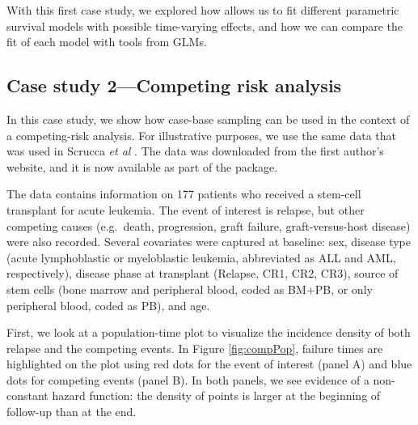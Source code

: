 With this first case study, we explored how  allows us to
fit different parametric survival models with possible time-varying
effects, and how we can compare the fit of each model with tools from
GLMs.

\hypertarget{case-study-2competing-risk-analysis}{%
\subsection{Case study 2---Competing risk
analysis}\label{case-study-2competing-risk-analysis}}

In this case study, we show how case-base sampling can be used in the
context of a competing-risk analysis. For illustrative purposes, we use
the same data that was used in Scrucca \emph{et al}
\citeyearpar{scrucca2010regression}. The data was downloaded from the
first author's website, and it is now available as part of the
 package.

The data contains information on 177 patients who received a stem-cell
transplant for acute leukemia. The event of interest is relapse, but
other competing causes (e.g.~death, progression, graft failure,
graft-versus-host disease) were also recorded. Several covariates were
captured at baseline: sex, disease type (acute lymphoblastic or
myeloblastic leukemia, abbreviated as ALL and AML, respectively),
disease phase at transplant (Relapse, CR1, CR2, CR3), source of stem
cells (bone marrow and peripheral blood, coded as BM+PB, or only
peripheral blood, coded as PB), and age.

First, we look at a population-time plot to visualize the incidence
density of both relapse and the competing events. In Figure
\ref{fig:compPop}, failure times are highlighted on the plot using red
dots for the event of interest (panel A) and blue dots for competing
events (panel B). In both panels, we see evidence of a non-constant
hazard function: the density of points is larger at the beginning of
follow-up than at the end.

